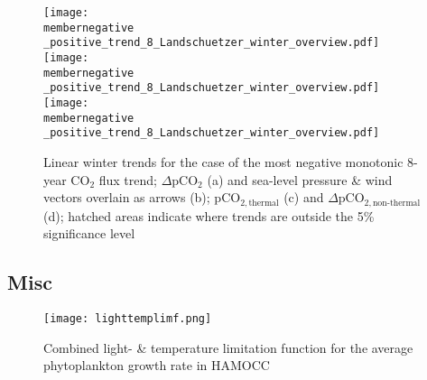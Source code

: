 \documentclass[12pt]{article}
\newcommand{\membernegative}{m143_1995_2002}
\begin{document}
\begin{figure}[h!]
\centering
	\texttt{[image: \\membernegative \_positive\_trend\_8\_Landschuetzer\_winter\_overview.pdf]}
	\texttt{[image: \\membernegative \_positive\_trend\_8\_Landschuetzer\_winter\_overview.pdf]}	
	\texttt{[image: \\membernegative \_positive\_trend\_8\_Landschuetzer\_winter\_overview.pdf]}
	\caption{Linear winter trends for the case of the most negative monotonic 8-year CO$_2$ flux trend; $\Delta$pCO$_2$ (a) and sea-level pressure \& wind vectors overlain as arrows (b); pCO$_{2,\text{thermal}}$ (c) and $\Delta$pCO$_{2,\text{non-thermal}}$ (d); hatched areas indicate where trends are outside the 5\% significance level}
	\label{fig:thermal_neg_winter}
\end{figure}

\clearpage
\subsection{Misc}
\begin{figure}[h!]
\centering
	\texttt{[image: lighttemplimf.png]}
	\caption{Combined light- \& temperature limitation function for the average phytoplankton growth rate in HAMOCC}
\label{fig:lighttemplimf}
\end{figure}
\end{document}
